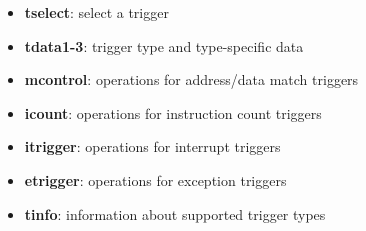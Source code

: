 \documentclass{article}
\begin{document}
	\begin{itemize}
	\item \textbf{tselect}: select a trigger
	\item \textbf{tdata1-3}: trigger type and type-specific data
	\item \textbf{mcontrol}: operations for address/data match triggers
	\item \textbf{icount}: operations for instruction count triggers
	\item \textbf{itrigger}: operations for interrupt triggers
	\item \textbf{etrigger}: operations for exception triggers
	\item \textbf{tinfo}: information about supported trigger types
	\end{itemize}
	
	
\end{document}
